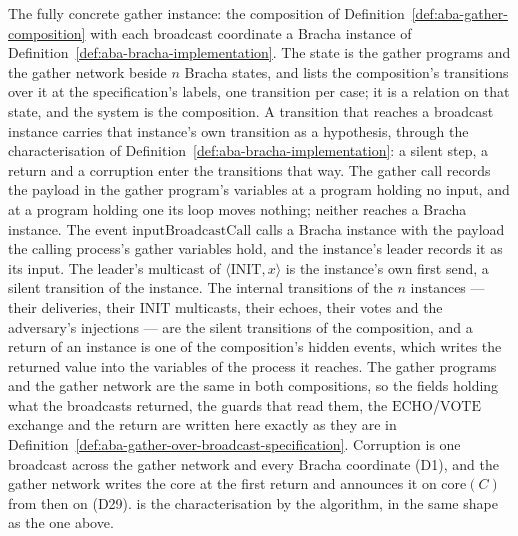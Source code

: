 \begin{definition}
  \label{def:aba-gather-over-bracha}
  \leanok
  The fully concrete gather instance: the composition of Definition~\ref{def:aba-gather-composition} with each broadcast coordinate a Bracha instance of Definition~\ref{def:aba-bracha-implementation}.
  The state is the gather programs and the gather network beside $n$ Bracha states, and  lists the composition's transitions over it at the specification's labels, one transition per case; it is a relation on that state, and the system is the composition.
  A transition that reaches a broadcast instance carries that instance's own transition as a hypothesis, through the characterisation of Definition~\ref{def:aba-bracha-implementation}: a silent step, a return and a corruption enter the transitions that way.
  The gather call records the payload in the gather program's variables at a program holding no input, and at a program holding one its loop moves nothing; neither reaches a Bracha instance.
  The event $\mathrm{inputBroadcastCall}$ calls a Bracha instance with the payload the calling process's gather variables hold, and the instance's leader records it as its input.
  The leader's multicast of $\langle\mathrm{INIT}, x\rangle$ is the instance's own first send, a silent transition of the instance.
  The internal transitions of the $n$ instances --- their deliveries, their $\mathrm{INIT}$ multicasts, their echoes, their votes and the adversary's injections --- are the silent transitions of the composition, and a return of an instance is one of the composition's hidden events, which writes the returned value into the variables of the process it reaches.
  The gather programs and the gather network are the same in both compositions, so the fields holding what the broadcasts returned, the guards that read them, the $\mathrm{ECHO}$/$\mathrm{VOTE}$ exchange and the return are written here exactly as they are in Definition~\ref{def:aba-gather-over-broadcast-specification}.
  Corruption is one broadcast across the gather network and every Bracha coordinate (D1), and the gather network writes the core at the first return and announces it on $\mathrm{core}(C)$ from then on (D29).
   is the characterisation by the algorithm, in the same shape as the one above.
\end{definition}
